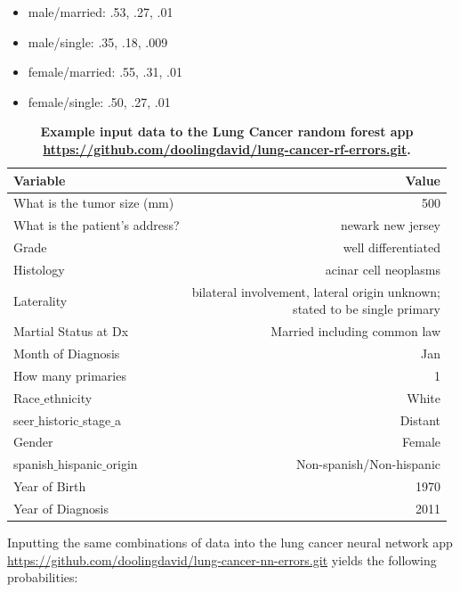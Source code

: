 \documentclass[10pt,letterpaper]{article}
\begin{document}
\begin{itemize}[noitemsep]
\item male/married:  .53, .27, .01
\item male/single: .35, .18, .009
\item female/married:  .55, .31, .01
\item female/single: .50, .27, .01
\end{itemize}


\begin{table}[!ht]
\begin{adjustwidth}{-2.25in}{0in} %
\caption{{\bf Example input data to the Lung Cancer random forest app \url{https://github.com/doolingdavid/lung-cancer-rf-errors.git}.}}
\begin{tabular}{lr}
\toprule
  Variable  & Value \\ 
\midrule
  What is the tumor size (mm) & 500 \\  
  What is the patient's address? & newark new jersey \\ 
  Grade & well differentiated \\  
  Histology & acinar cell neoplasms \\ 
  Laterality & \makecell{bilateral involvement, lateral origin unknown; \\ stated to be single primary} \\  
 Martial Status at Dx & Married including common law \\  
 Month of Diagnosis & Jan \\  
 How many primaries & 1 \\  
  Race$\_$ethnicity & White \\  
  seer$\_$historic$\_$stage$\_$a  & Distant \\ 
  Gender & Female \\  
  spanish$\_$hispanic$\_$origin & Non-spanish/Non-hispanic \\ 
 Year of Birth & 1970 \\  
  Year of Diagnosis & 2011 \\
\bottomrule
\end{tabular}
\label{tab:lungmaritalstatus}
\end{adjustwidth}
\end{table}



Inputting the same combinations of data into the lung cancer neural network app \url{https://github.com/doolingdavid/lung-cancer-nn-errors.git}
yields the following probabilities:
\end{document}
